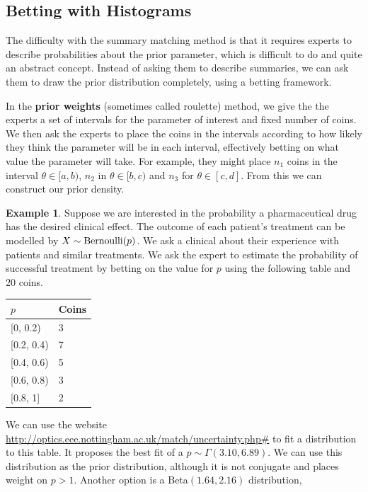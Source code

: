 \documentclass[
]{book}
\theoremstyle{definition}
\theoremstyle{definition}
\newtheorem{example}{Example}[chapter]
\theoremstyle{definition}
\theoremstyle{definition}
\theoremstyle{remark}
\begin{document}
\hypertarget{betting-with-histograms}{%
\subsection{Betting with Histograms}\label{betting-with-histograms}}

The difficulty with the summary matching method is that it requires experts to describe probabilities about the prior parameter, which is difficult to do and quite an abstract concept. Instead of asking them to describe summaries, we can ask them to draw the prior distribution completely, using a betting framework.

In the \textbf{prior weights} (sometimes called roulette) method, we give the the experts a set of intervals for the parameter of interest and fixed number of coins. We then ask the experts to place the coins in the intervals according to how likely they think the parameter will be in each interval, effectively betting on what value the parameter will take. For example, they might place \(n_1\) coins in the interval \(\theta \in [a, b)\), \(n_2\) in \(\theta \in [b, c)\) and \(n_3\) for \(\theta \in [c, d]\). From this we can construct our prior density.

\begin{example}
Suppose we are interested in the probability a pharmaceutical drug has the desired clinical effect. The outcome of each patient's treatment can be modelled by \(X\sim\hbox{Bernoulli}(p)\). We ask a clinical about their experience with patients and similar treatments. We ask the expert to estimate the probability of successful treatment by betting on the value for \(p\) using the following table and 20 coins.

\begin{longtable}[]{@{}ll@{}}
\toprule\noalign{}
\(p\) & Coins \\
\midrule\noalign{}
\endhead
\bottomrule\noalign{}
\endlastfoot
{[}0, 0.2) & 3 \\
{[}0.2, 0.4) & 7 \\
{[}0.4, 0.6) & 5 \\
{[}0.6, 0.8) & 3 \\
{[}0.8, 1{]} & 2 \\
\end{longtable}

We can use the website \url{http://optics.eee.nottingham.ac.uk/match/uncertainty.php\#} to fit a distribution to this table. It proposes the best fit of a \(p \sim \Gamma(3.10, 6.89)\). We can use this distribution as the prior distribution, although it is not conjugate and places weight on \(p > 1\). Another option is a Beta\((1.64, 2.16)\) distribution,
\end{example}
\end{document}
